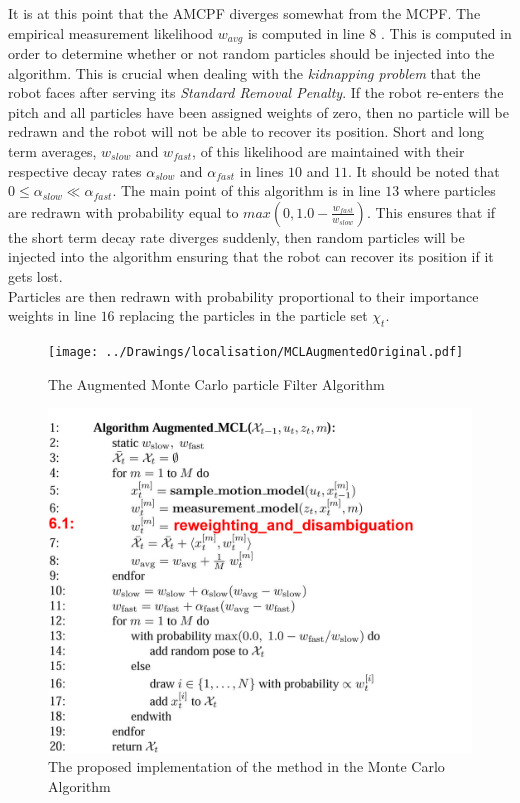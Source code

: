 \documentclass[11pt]{report}
\begin{document}
It is at this point that the AMCPF diverges somewhat from the MCPF. The empirical measurement likelihood $w_{avg}$ is computed in line $8$ \cite{Thrun2002}. This is computed in order to determine whether or not random particles should be injected into the algorithm. This is crucial when dealing with the \textit{kidnapping problem} that the robot faces after serving its \textit{Standard Removal Penalty}. If the robot re-enters the pitch and all particles have been assigned weights of zero, then no particle will be redrawn and the robot will not be able to recover its position. Short and long term averages, $w_{slow}$ and $w_{fast}$, of this likelihood are maintained with their respective decay rates $\alpha_{slow}$ and $\alpha_{fast}$ in lines $10$ and $11$. It should be noted that $0 \leq \alpha_{slow} \ll \alpha_{fast}$. The main point of this algorithm is in line $13$ where particles are redrawn with probability equal to $max(0, 1.0 - \frac{w_{fast}}{w_{slow}})$. This ensures that if the short term decay rate diverges suddenly, then random particles will be injected into the algorithm ensuring that the robot can recover its position if it gets lost.\\

Particles are then redrawn with probability proportional to their importance weights in line $16$ replacing the particles in the particle set $\chi_t$.  

\begin{figure}[ht!]
\begin{minipage}[b]{0.5\linewidth}
  \centering
    \texttt{[image: ../Drawings/localisation/MCLAugmentedOriginal.pdf]}
    \caption{The Augmented Monte Carlo particle Filter Algorithm}
    \label{fig:augmented}
\end{minipage}
\begin{minipage}[b]{0.5\linewidth}
  \centering
    \includegraphics[width=1.2\textwidth]{../Drawings/localisation/MCLAugmented.jpg}
    \caption{The proposed implementation of the method in the Monte Carlo Algorithm \cite{Thrun2002}}
    \label{fig:mclProposed}
\end{minipage}
\end{figure}
\end{document}
